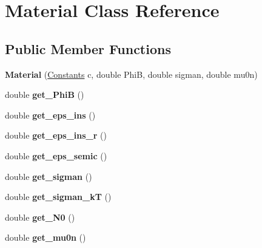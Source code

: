 \hypertarget{classMaterial}{\section{Material Class Reference}
\label{classMaterial}
}
\subsection*{Public Member Functions}
\begin{DoxyCompactItemize}
\item 
\hypertarget{classMaterial_acaea8fce74886487303525283c131f1d}{{\bfseries Material} (\hyperlink{classConstants}{Constants} c, double Phi\-B, double sigman, double mu0n)}\label{classMaterial_acaea8fce74886487303525283c131f1d}

\item 
\hypertarget{classMaterial_a7396b0390b0c385c3a054a3a86bf8bcd}{double {\bfseries get\-\_\-\-Phi\-B} ()}\label{classMaterial_a7396b0390b0c385c3a054a3a86bf8bcd}

\item 
\hypertarget{classMaterial_a7a134130f6dc03ad4b12cfd932135025}{double {\bfseries get\-\_\-eps\-\_\-ins} ()}\label{classMaterial_a7a134130f6dc03ad4b12cfd932135025}

\item 
\hypertarget{classMaterial_a8fbc7074de99305b53561676de3a61b6}{double {\bfseries get\-\_\-eps\-\_\-ins\-\_\-r} ()}\label{classMaterial_a8fbc7074de99305b53561676de3a61b6}

\item 
\hypertarget{classMaterial_a9c312d5a430db4a8219325947a8117fb}{double {\bfseries get\-\_\-eps\-\_\-semic} ()}\label{classMaterial_a9c312d5a430db4a8219325947a8117fb}

\item 
\hypertarget{classMaterial_a141b890efcbda43e8a8a42df87812416}{double {\bfseries get\-\_\-sigman} ()}\label{classMaterial_a141b890efcbda43e8a8a42df87812416}

\item 
\hypertarget{classMaterial_a4be3d94633d65c598d5405b4b9bd8503}{double {\bfseries get\-\_\-sigman\-\_\-k\-T} ()}\label{classMaterial_a4be3d94633d65c598d5405b4b9bd8503}

\item 
\hypertarget{classMaterial_a9cd2c778a1c5684b41512e3e902cae6d}{double {\bfseries get\-\_\-\-N0} ()}\label{classMaterial_a9cd2c778a1c5684b41512e3e902cae6d}

\item 
\hypertarget{classMaterial_ab30a5a2f70f6dfd62eff97940b049823}{double {\bfseries get\-\_\-mu0n} ()}\label{classMaterial_ab30a5a2f70f6dfd62eff97940b049823}


\end{DoxyCompactItemize}
